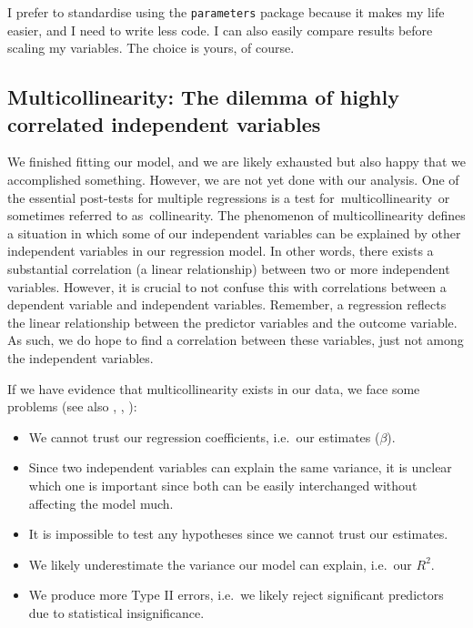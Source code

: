 \documentclass[
]{book}
\begin{document}
I prefer to standardise using the \texttt{parameters} package because it makes my life easier, and I need to write less code. I can also easily compare results before scaling my variables. The choice is yours, of course.

\hypertarget{multicollinearity-the-dilemma-of-highly-correlated-independent-variables}{%
\subsection{Multicollinearity: The dilemma of highly correlated independent variables}\label{multicollinearity-the-dilemma-of-highly-correlated-independent-variables}}

We finished fitting our model, and we are likely exhausted but also happy that we accomplished something. However, we are not yet done with our analysis. One of the essential post-tests for multiple regressions is a test for~multicollinearity~or sometimes referred to as~collinearity. The phenomenon of multicollinearity defines a situation in which some of our independent variables can be explained by other independent variables in our regression model. In other words, there exists a substantial correlation (a linear relationship) between two or more independent variables. However, it is crucial to not confuse this with correlations between a dependent variable and independent variables. Remember, a regression reflects the linear relationship between the predictor variables and the outcome variable. As such, we do hope to find a correlation between these variables, just not among the independent variables.

If we have evidence that multicollinearity exists in our data, we face some problems (see also \citet{cohen2014applied}, \citet{field2013discovering}, \citet{sage-methods2004dbw}):

\begin{itemize}
\item
  We cannot trust our regression coefficients, i.e.~our estimates (\(\beta\)).
\item
  Since two independent variables can explain the same variance, it is unclear which one is important since both can be easily interchanged without affecting the model much.
\item
  It is impossible to test any hypotheses since we cannot trust our estimates.
\item
  We likely underestimate the variance our model can explain, i.e.~our \(R^2\).
\item
  We produce more Type II errors, i.e.~we likely reject significant predictors due to statistical insignificance.
\end{itemize}
\end{document}

